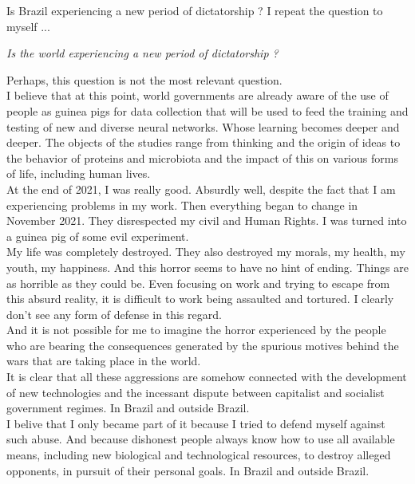 \documentclass[11pt]{book}
\begin{document}
\noindent Is Brazil experiencing a new period of dictatorship ? I repeat the question to myself ...

\noindent \begin{center} \emph{Is the world experiencing a new period of dictatorship ?} \end{center}

\noindent Perhaps, this question is not the most relevant question. \\

\noindent I believe that at this point, world governments are already aware of the use of people as guinea pigs for data collection that will be used to feed the training and testing of new and diverse neural networks. Whose learning becomes deeper and deeper. The objects of the studies range from thinking and the origin of ideas to the behavior of proteins and microbiota and the impact of this on various forms of life, including human lives. \\

\noindent At the end of 2021, I was really good. Absurdly well, despite the fact that I am experiencing problems in my work. Then everything began to change in November 2021. They disrespected my civil and Human Rights. I was turned into a guinea pig of some evil experiment.  \\

\noindent My life was completely destroyed. They also destroyed my morals, my health, my youth, my happiness. And this horror seems to have no hint of ending.  Things are as horrible as they could be. Even focusing on work and trying to escape from this absurd reality, it is difficult to work being assaulted and tortured.  I clearly don't see any form of defense in this regard. \\

\noindent And it is not possible for me to imagine the horror experienced by the people who are bearing the consequences generated by the spurious motives behind the wars that are taking place in the world. \\

\noindent It is clear that all these aggressions are somehow connected with the development of new technologies and the incessant dispute between capitalist and socialist government regimes. In Brazil and outside Brazil. \\

\noindent I belive that I only became part of it because I tried to defend myself against such abuse. And because dishonest people always know how to use all available means, including new biological and technological resources, to destroy alleged opponents, in pursuit of their personal goals. In Brazil and outside Brazil. \\
\end{document}
